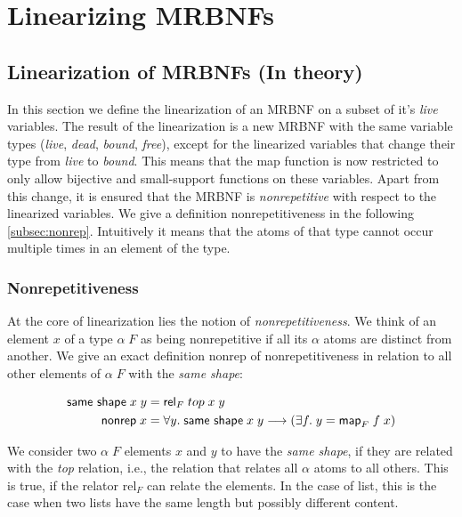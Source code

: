 
\chapter{Linearizing MRBNFs}
\label{chapter:methodology}

  \section{Linearization of MRBNFs (In theory)}

  In this section we define the linearization of an MRBNF on a subset of it's \textit{live} variables. The result of the linearization is a new MRBNF with the same variable types (\textit{live}, \textit{dead}, \textit{bound}, \textit{free}), except for the linearized variables that change their type from \textit{live} to \textit{bound}. This means that the map function is now restricted to only allow bijective and small-support functions on these variables. Apart from this change, it is ensured that the MRBNF is \textit{nonrepetitive} with respect to the linearized variables. We give a definition nonrepetitiveness in the following \autoref{subsec:nonrep}. Intuitively it means that the atoms of that type cannot occur multiple times in an element of the type.

    \subsection{Nonrepetitiveness}
    \label{subsec:nonrep}
    At the core of linearization lies the notion of \textit{nonrepetitiveness}. We think of an element $x$ of a type $\alpha\; F$ as being nonrepetitive if all its $\alpha$ atoms are distinct from another. We give an exact definition \textsf{nonrep} of nonrepetitiveness in relation to all other elements of $\alpha\; F$ with the \textit{same shape}:

    \begin{align}
      \text{\textsf{same shape}}\; x\; y &= \text{\textsf{rel}}_F\; top\; x\; y\\
      \text{\textsf{nonrep}}\; x &= \forall y.\; \text{\textsf{same shape}}\; x\; y \longrightarrow (\exists f.\; y = \text{\textsf{map}}_F\; f\; x)
    \end{align}

    We consider two $\alpha\; F$ elements $x$ and $y$ to have the \textit{same shape}, if they are related with the \textit{top} relation, i.e., the relation that relates all $\alpha$ atoms to all others. This is true, if the relator \textsf{rel}$_F$ can relate the elements. In the case of \textsf{list}, this is the case when two lists have the same length but possibly different content. 

